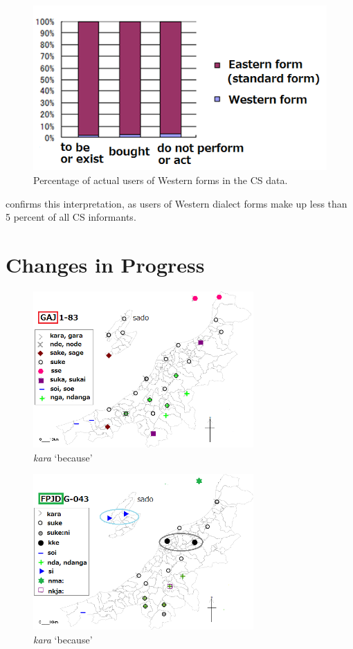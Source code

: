 \documentclass[output=paper]{LSP/langsci}
\begin{document}
\begin{figure}
\includegraphics[width=.75\textwidth]{illustrations/fuku2_fig3}
\caption{Percentage of actual users of Western forms in the CS data.}
\label{fig:3}
\end{figure}

 confirms this interpretation, as users of Western dialect forms make up less than 5 percent of all CS informants.

\section{Changes in Progress}

\begin{figure}
\includegraphics[width=0.75\textwidth]{illustrations/fuku2_fig4a}
\caption{\textit{kara} `because'}
\label{fig:4a}
\end{figure}

\begin{figure}
\includegraphics[width=0.75\textwidth]{illustrations/fuku2_fig4b}
\caption{\textit{kara} `because'}
\label{fig:4b}
\end{figure}
\end{document}
